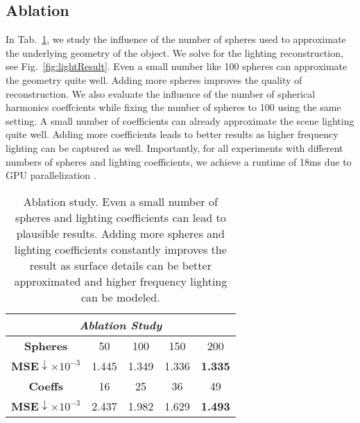 \subsection{Ablation}
%
In Tab.~\ref{tab:ablation}, we study the influence of the number of spheres used to approximate the underlying geometry of the object.
%
We solve for the lighting reconstruction, see Fig.~\ref{fig:lightResult}.
%
Even a small number like 100 spheres can approximate the geometry quite well.
%
Adding more spheres improves the quality of reconstruction.
%
We also evaluate the influence of the number of spherical harmonics coeffcients while fixing the number of spheres to 100 using the same setting.
%
A small number of coefficients can already approximate the scene lighting quite well.
%
Adding more coefficients leads to better results as higher frequency lighting can be captured as well.
%
Importantly, for all experiments with different numbers of spheres and lighting coefficients,  we achieve a runtime of 18ms due to GPU parallelization .
%
%
\begin{table}
	\begin{center}
		\begin{tabular}{|c|c|c|c|c|}
			\hline
			\multicolumn{5}{|c|}{\textit{Ablation Study}} \\
			\hline
		    \textbf{Spheres}                                        & 	50 	                    & 	100 	            & 		150          & 	200            	     \\
			\textbf{MSE}$\downarrow \times 10^{-3}$                 & 1.445                     & 1.349                 & 1.336            & \textbf{1.335}                      \\


			\hline
		    \textbf{Coeffs}                                         & 16                        &  25 	               & 36            &    49                           	    \\
			\textbf{MSE}$\downarrow \times 10^{-3}$                 & 2.437                     & 1.982                 & 1.629          & \textbf{1.493}              \\
			\hline
		\end{tabular}
	\end{center}
	\caption
	{
		Ablation study.
		Even a small number of spheres and lighting coefficients can lead to plausible results.
		Adding more spheres and lighting coefficients constantly improves the result as surface details can be better approximated and higher frequency lighting can be modeled.
	}
	\label{tab:ablation}
\end{table}
%
%